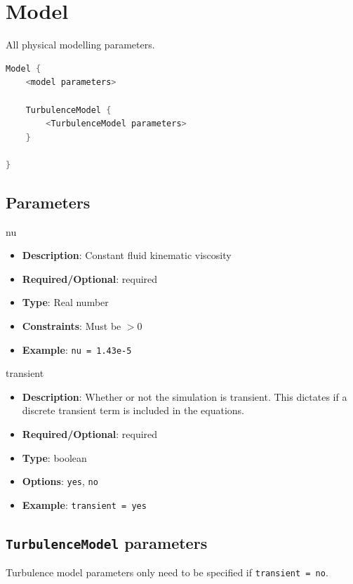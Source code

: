 \section{Model}

All physical modelling parameters.

\begin{lstlisting}[language=C++]
Model {
    <model parameters>
    
    TurbulenceModel {
        <TurbulenceModel parameters>
    }

}
\end{lstlisting}

\subsection*{Parameters}

nu
\vspace{\the\parameterListSpacing}
\begin{itemize}[noitemsep,topsep=0pt]
    \item {\bf Description}: Constant fluid kinematic viscosity
    \item {\bf Required/Optional}: required
    \item {\bf Type}: Real number
    \item {\bf Constraints}: Must be $>0$
    \item {\bf Example}: \lstinline!nu = 1.43e-5!
\end{itemize}


transient
\vspace{\the\parameterListSpacing}
\begin{itemize}
    \item {\bf Description}: Whether or not the simulation is transient. This dictates if a discrete transient term is included in the equations.
    \item {\bf Required/Optional}: required
    \item {\bf Type}: boolean
    \item {\bf Options}: \lstinline!yes!, \lstinline!no!
    \item {\bf Example}: \lstinline!transient = yes!
\end{itemize}

\subsection*{\lstinline!TurbulenceModel! parameters }
Turbulence model parameters only need to be specified if \lstinline!transient = no!.

